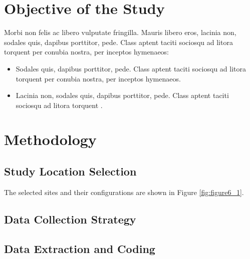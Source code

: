 
\section{Objective of the Study}
 Morbi non felis ac libero vulputate fringilla. Mauris
libero eros, lacinia non, sodales quis, dapibus porttitor, pede. Class aptent taciti sociosqu ad litora torquent per conubia nostra, per inceptos hymenaeos:

\begin{itemize}

  \item Sodales quis, dapibus porttitor, pede. Class aptent taciti sociosqu ad litora torquent per conubia nostra, per inceptos hymenaeos.
  
  \item Lacinia non, sodales quis, dapibus porttitor, pede. Class aptent taciti sociosqu ad litora torquent .
  
\end{itemize}



\section{Methodology}
\lipsum[33]



\subsection{Study Location Selection}
\lipsum[14] The selected sites and their configurations are shown in Figure \ref{fig:figure6_1}.




\subsection{Data Collection Strategy}
\lipsum[4-5]


\subsection{Data Extraction and Coding}
\lipsum[8]


